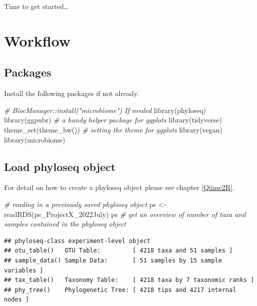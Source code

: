 \documentclass[
]{book}
\newenvironment{Shaded}{\begin{snugshade}}{\end{snugshade}}
\newcommand{\CommentTok}[1]{\textcolor[rgb]{0.56,0.35,0.01}{\textit{#1}}}
\newcommand{\FunctionTok}[1]{\textcolor[rgb]{0.00,0.00,0.00}{#1}}
\newcommand{\NormalTok}[1]{#1}
\newcommand{\OtherTok}[1]{\textcolor[rgb]{0.56,0.35,0.01}{#1}}
\newcommand{\StringTok}[1]{\textcolor[rgb]{0.31,0.60,0.02}{#1}}
\begin{document}
Time to get started\ldots{}

\hypertarget{workflow-3}{%
\section{Workflow}\label{workflow-3}}

\hypertarget{packages-1}{%
\subsection{Packages}\label{packages-1}}

Install the following packages if not already.

\begin{Shaded}
\begin{Highlighting}[]
\CommentTok{\# BiocManager::install("microbiome") If needed}
\FunctionTok{library}\NormalTok{(phyloseq)}
\FunctionTok{library}\NormalTok{(ggpubr)       }\CommentTok{\# a handy helper package for ggplots}
\FunctionTok{library}\NormalTok{(tidyverse)}
\FunctionTok{theme\_set}\NormalTok{(}\FunctionTok{theme\_bw}\NormalTok{())  }\CommentTok{\# setting the theme for ggplots}
\FunctionTok{library}\NormalTok{(vegan)}
\FunctionTok{library}\NormalTok{(microbiome)}
\end{Highlighting}
\end{Shaded}

\hfill\break

\hypertarget{load-phyloseq-object}{%
\subsection{Load phyloseq object}\label{load-phyloseq-object}}

For detail on how to create a phyloseq object please see chapter \ref{Qiime2R}.

\begin{Shaded}
\begin{Highlighting}[]
\CommentTok{\# reading in a previously saved phyloseq object}
\NormalTok{ps }\OtherTok{\textless{}{-}} \FunctionTok{readRDS}\NormalTok{(}\StringTok{\textquotesingle{}ps\_ProjectX\_2022July\textquotesingle{}}\NormalTok{)}
\NormalTok{ps  }\CommentTok{\# get an overview of number of taxa and samples contained in the phyloseq object}
\end{Highlighting}
\end{Shaded}

\begin{verbatim}
## phyloseq-class experiment-level object
## otu_table()   OTU Table:         [ 4218 taxa and 51 samples ]
## sample_data() Sample Data:       [ 51 samples by 15 sample variables ]
## tax_table()   Taxonomy Table:    [ 4218 taxa by 7 taxonomic ranks ]
## phy_tree()    Phylogenetic Tree: [ 4218 tips and 4217 internal nodes ]
\end{verbatim}
\end{document}
